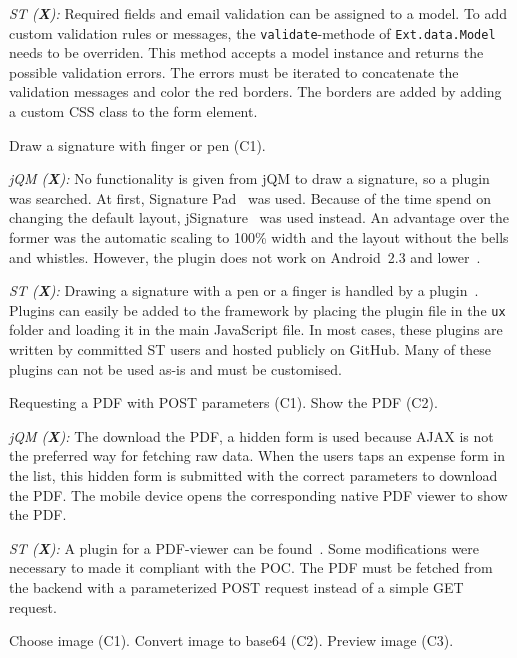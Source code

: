 \documentclass[a4paper]{artikel3}
\newcommand{\code}[1]{\texttt{#1}}
\renewcommand{\paragraph}[1]{\vspace{2mm} \noindent {\bf #1}  }
\newcommand{\framework}[2]{ \emph{#1 (\textbf{#2}): }} %
\newcommand{\challenge}[1]{\paragraph{#1}}
\begin{document}
\framework{ST}{X}
Required fields and email validation can be assigned to a model.  To add custom validation rules or messages,  the \code{validate}-methode of \code{Ext.data.Model} needs to be overriden.  This method accepts a model instance and returns the possible validation errors.  The errors must be iterated to concatenate the validation messages and color the red borders.  The borders are added by adding a custom CSS class to the form element.

\challenge{Signature (C1)}
Draw a signature with finger or pen (C1).

\framework{jQM}{X}
No functionality is given from jQM to draw a signature, so a plugin was searched.
At first, Signature Pad~\cite{Bradley2013} was used.
Because of the time spend on changing the default layout, jSignature~\cite{Systems2013} was used instead.
An advantage over the former was the automatic scaling to 100\% width and the layout without the bells and whistles.
However, the plugin does not work on Android~2.3 and lower~\cite{Systems2013}.

\framework{ST}{X}
Drawing a signature with a pen or a finger is handled by a plugin~\cite{SimFla2011}.  Plugins can easily be added to the framework by placing the plugin file in the \code{ux} folder and loading it in the main JavaScript file.  In most cases,  these plugins are written by committed ST users and hosted publicly on GitHub. Many of these plugins can not be used as-is and must be customised.

\challenge{Show PDF (C1,C2)}
Requesting a PDF with POST parameters (C1).
Show the PDF (C2).

\framework{jQM}{X}
The download the PDF, a hidden form is used because AJAX is not the preferred way for fetching raw data.
When the users taps an expense form in the list, this hidden form is submitted with the correct parameters to download the PDF.
The mobile device opens the corresponding native PDF viewer to show the PDF.

\framework{ST}{X}
A plugin for a PDF-viewer can be found~\cite{Fiedler2012}.  Some modifications were necessary to made it compliant with the POC.  The PDF must be fetched from the backend with a parameterized POST request instead of a simple GET request.  

\challenge{Attach image (C1,C2,C3)}
Choose image (C1).
Convert image to base64 (C2).
Preview image (C3).
\end{document}
